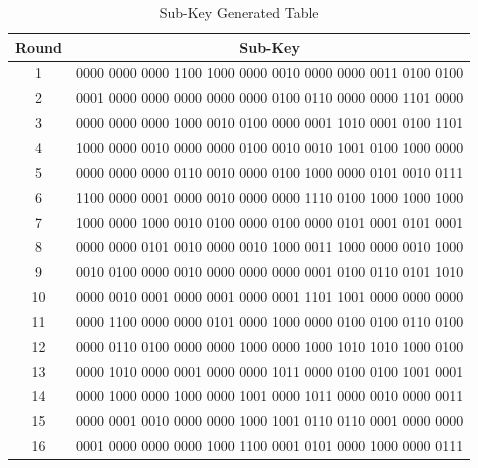 \documentclass[12pt, letterpaper]{article}
\begin{document}
\begin{table}[h]
    \centering
    \begin{tabular}{|c|c|}
        \hline
        \textbf{Round} & \textbf{Sub-Key} \\
        \hline
        1 & 0000 0000 0000 1100 1000 0000 0010 0000 0000 0011 0100 0100
 \\
        \hline
        2 & 0001 0000 0000 0000 0000 0000 0100 0110 0000 0000 1101 0000
 \\
        \hline
        3 & 0000 0000 0000 1000 0010 0100 0000 0001 1010 0001 0100 1101
 \\
        \hline
        4 & 1000 0000 0010 0000 0000 0100 0010 0010 1001 0100 1000 0000
 \\
        \hline
        5 & 0000 0000 0000 0110 0010 0000 0100 1000 0000 0101 0010 0111
 \\
        \hline 
        6 & 1100 0000 0001 0000 0010 0000 0000 1110 0100 1000 1000 1000
 \\
        \hline
        7 & 1000 0000 1000 0010 0100 0000 0100 0000 0101 0001 0101 0001
 \\
        \hline
        8 & 0000 0000 0101 0010 0000 0010 1000 0011 1000 0000 0010 1000
 \\
        \hline
        9 & 0010 0100 0000 0010 0000 0000 0000 0001 0100 0110 0101 1010
 \\
        \hline
        10 & 0000 0010 0001 0000 0001 0000 0001 1101 1001 0000 0000 0000
 \\
        \hline
        11 & 0000 1100 0000 0000 0101 0000 1000 0000 0100 0100 0110 0100
 \\
        \hline
        12 & 0000 0110 0100 0000 0000 1000 0000 1000 1010 1010 1000 0100 \\
        \hline
        13 & 0000 1010 0000 0001 0000 0000 1011 0000 0100 0100 1001 0001 \\
        \hline
        14 & 0000 1000 0000 1000 0000 1001 0000 1011 0000 0010 0000 0011
 \\
        \hline
        15 &  0000 0001 0010 0000 0000 1000 1001 0110 0110 0001 0000 0000 \\
        \hline
        16 & 0001 0000 0000 0000 1000 1100 0001 0101 0000 1000 0000 0111 \\
        \hline

    \end{tabular}
    \caption{Sub-Key Generated Table}
    \label{tab:student-info}
\end{table}
\end{document}
